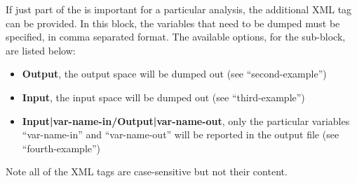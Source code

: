 If just part of the  is important for a particular analysis, the
additional XML tag  can be provided.
%
In this block, the variables that need to be dumped must be specified, in
comma separated format.
%
The available options, for the  sub-block, are listed below:
\vspace{-5mm}
\begin{itemize}
  \itemsep0em
  \item \textbf{Output}, the output space will be dumped out (see
  ``second-example'')
  \item \textbf{Input}, the input space will be dumped out (see
  ``third-example'')
  \item \textbf{Input|var-name-in/Output|var-name-out}, only the particular
  variables ``var-name-in'' and ``var-name-out'' will be reported in the output
  file (see ``fourth-example'')
\end{itemize}
\vspace{-5mm}
Note all of the XML tags are case-sensitive but not their content.

